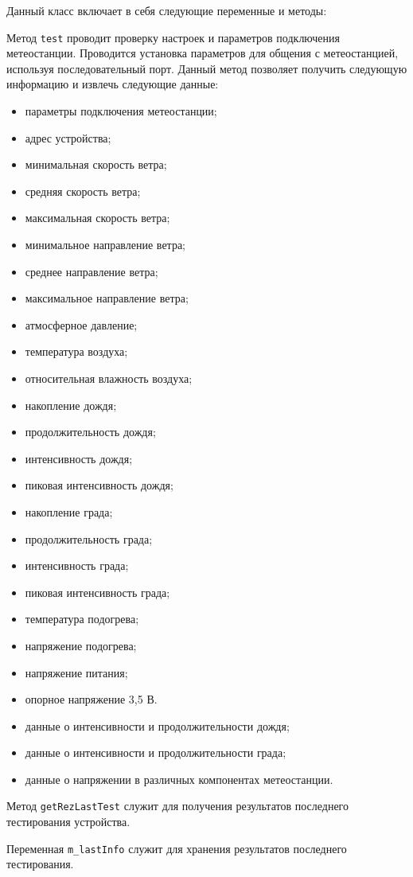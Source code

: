Данный класс включает в себя следующие переменные и методы:
\begin{enum}
	\item Метод \texttt{test} проводит проверку настроек и параметров подключения метеостанции. Проводится установка
		параметров для общения с метеостанцией, используя последовательный порт. Данный метод позволяет получить
		следующую информацию и извлечь следующие данные:
		\begin{itemize}
			\item параметры подключения метеостанции;
			\item адрес устройства;
			\item минимальная скорость ветра;
			\item средняя скорость ветра;
			\item максимальная скорость ветра;
			\item минимальное направление ветра;
			\item среднее направление ветра;
			\item максимальное направление ветра;
			\item атмосферное давление;
			\item температура воздуха;
			\item относительная влажность воздуха;
			\item накопление дождя;
			\item продолжительность дождя;
			\item интенсивность дождя;
			\item пиковая интенсивность дождя;
			\item накопление града;
			\item продолжительность града;
			\item интенсивность града;
			\item пиковая интенсивность града;
			\item температура подогрева;
			\item напряжение подогрева;
			\item напряжение питания;
			\item опорное напряжение 3,5 В.
			\item данные о интенсивности и продолжительности дождя;
			\item данные о интенсивности и продолжительности града;
			\item данные о напряжении в различных компонентах метеостанции.
		\end{itemize}
	\item Метод \texttt{getRezLastTest} служит для получения результатов последнего тестирования устройства.
	\item Переменная \texttt{m\_lastInfo} служит для хранения результатов последнего тестирования.
\end{enum}

